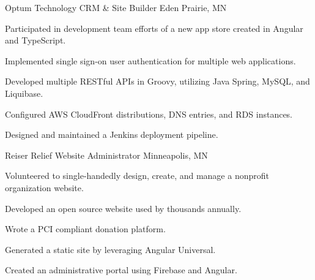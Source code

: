 \begin{cventries}
    \cventry
    {Optum Technology} %
    {CRM \& Site Builder} %
    {Eden Prairie, MN} %
    {} %
    {
    \begin{cvitems} %
        \item {Participated in development team efforts of a new app store created in Angular and TypeScript.}
        \item {Implemented single sign-on user authentication for multiple web applications.}
        \item {Developed multiple RESTful APIs in Groovy, utilizing Java Spring, MySQL, and Liquibase.}
        \item {Configured AWS CloudFront distributions, DNS entries, and RDS instances.}
        \item {Designed and maintained a Jenkins deployment pipeline.}
    \end{cvitems}
    }

    \cventry
    {Reiser Relief} %
    {Website Administrator} %
    {Minneapolis, MN} %
    {} %
    {
    \begin{cvitems} %
        \item {Volunteered to single‑handedly design, create, and manage a nonprofit organization website.}
        \item {Developed an open source website used by thousands annually.}
        \item {Wrote a PCI compliant donation platform.}
        \item {Generated a static site by leveraging Angular Universal.}
        \item {Created an administrative portal using Firebase and Angular.}
    \end{cvitems}
    }

\end{cventries}
